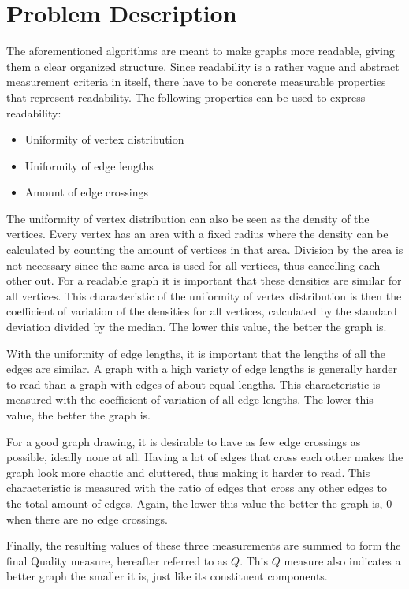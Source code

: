 \documentclass[a4paper,12pt]{article}
\begin{document}
  \section{Problem Description}
    The aforementioned algorithms are meant to make graphs more readable, giving them a clear organized structure.
    Since readability is a rather vague and abstract measurement criteria in itself, there have to be concrete measurable properties that represent readability.
    The following properties can be used to express readability: \cite{kobourov2012spring}
    \begin{itemize}
      \item Uniformity of vertex distribution
      \item Uniformity of edge lengths
      \item Amount of edge crossings
    \end{itemize}
    The uniformity of vertex distribution can also be seen as the density of the vertices.
    Every vertex has an area with a fixed radius where the density can be calculated by counting the amount of vertices in that area. Division by the area is not necessary since the same area is used for all vertices, thus cancelling each other out.
    For a readable graph it is important that these densities are similar for all vertices.
    This characteristic of the uniformity of vertex distribution is then the coefficient of variation of the densities for all vertices, calculated by the standard deviation divided by the median. The lower this value, the better the graph is.

    With the uniformity of edge lengths, it is important that the lengths of all the edges are similar.
    A graph with a high variety of edge lengths is generally harder to read than a graph with edges of about equal lengths.
    This characteristic is measured with the coefficient of variation of all edge lengths. The lower this value, the better the graph is.

    For a good graph drawing, it is desirable to have as few edge crossings as possible, ideally none at all.
    Having a lot of edges that cross each other makes the graph look more chaotic and cluttered, thus making it harder to read. This characteristic is measured with the ratio of edges that cross any other edges to the total amount of edges. Again, the lower this value the better the graph is, $0$ when there are no edge crossings.

	Finally, the resulting values of these three measurements are summed to form the final Quality measure, hereafter referred to as $Q$. This $Q$ measure also indicates a better graph the smaller it is, just like its constituent components.
\end{document}
